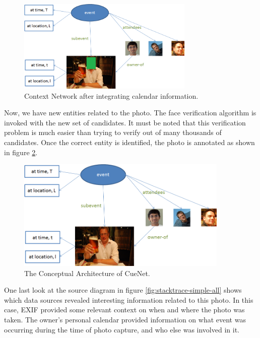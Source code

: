 \begin{figure}[h]
\centering
\includegraphics[width=0.75\textwidth]{media/chapter4/stacktrace/context-network-torsten.png}
\caption{Context Network after integrating calendar information.}
\label{fig:stacktrace-simple-context-network}
\end{figure}

Now, we have new entities related to the photo. The face verification algorithm is invoked with the new set of candidates. It must be noted that this verification problem is much easier than trying to verify out of many thousands of candidates. Once the correct entity is identified, the photo is annotated as shown in figure \ref{fig:stacktrace-simple-torsten-tagged}.

\begin{figure}[h]
\centering
\includegraphics[width=0.9\textwidth]{media/chapter4/stacktrace/torsten-tagged.png}
\caption{The Conceptual Architecture of CueNet.}
\label{fig:stacktrace-simple-torsten-tagged}
\end{figure}

One last look at the source diagram in figure \ref{fig:stacktrace-simple-all} shows which data sources revealed interesting information related to this photo. In this case, EXIF provided some relevant context on when and where the photo was taken. The owner's personal calendar provided information on what event was occurring during the time of photo capture, and who else was involved in it.

